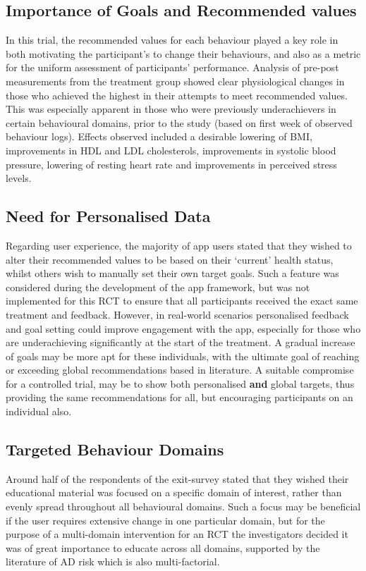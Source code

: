\subsection{Importance of Goals and Recommended values}
In this trial, the recommended values for each behaviour played a key role in both motivating the participant's to change their behaviours, and also as a metric for the uniform assessment of participants’ performance. Analysis of pre-post measurements from the treatment group showed clear physiological changes in those who achieved the highest in their attempts to meet recommended values. This was especially apparent in those who were previously underachievers in certain behavioural domains, prior to the study (based on first week of observed behaviour logs). Effects observed included a desirable lowering of BMI, improvements in HDL and LDL cholesterols, improvements in systolic blood pressure, lowering of resting heart rate and improvements in perceived stress levels.

\subsection{Need for Personalised Data} \label{subsection: finding-need-personalised}
Regarding user experience, the majority of app users stated that they wished to alter their recommended values to be based on their ‘current’ health status, whilst others wish to manually set their own target goals. Such a feature was considered during the development of the app framework, but was not implemented for this RCT to ensure that all participants received the exact same treatment and feedback.
However, in real-world scenarios personalised feedback and goal setting  could improve engagement with the app, especially for those who are underachieving significantly at the start of the treatment. A gradual increase of goals may be more apt for these individuals, with the ultimate goal of reaching or exceeding global recommendations based in literature.
A suitable compromise for a controlled trial, may be to show both personalised \textbf{and} global targets, thus providing the same recommendations for all, but encouraging participants on an individual also.

\subsection{Targeted Behaviour Domains}
Around half of the respondents of the exit-survey stated that they wished  their educational material was focused on a specific domain of interest, rather than evenly spread throughout all behavioural domains. Such a focus may be beneficial if the user requires extensive change in one particular domain, but for the purpose of a multi-domain intervention for an RCT the investigators decided it was of great importance to educate across all domains, supported by the literature of AD risk which is also multi-factorial.

